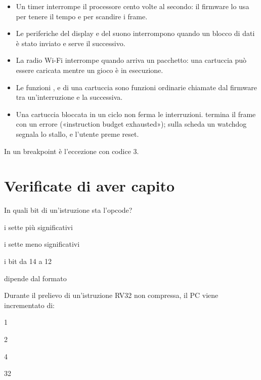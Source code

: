\begin{itemize}
\item Un timer interrompe il processore cento volte al secondo: il firmware lo
  usa per tenere il tempo e per scandire i frame.
\item Le periferiche del display e del suono interrompono quando un blocco di
  dati è stato inviato e serve il successivo.
\item La radio Wi-Fi interrompe quando arriva un pacchetto: una cartuccia può
  essere caricata mentre un gioco è in esecuzione.
\item Le funzioni ,  e  di una cartuccia
  sono funzioni ordinarie chiamate dal firmware tra un'interruzione e la
  successiva.
\item Una cartuccia bloccata in un ciclo non ferma le interruzioni. \prgqt
  termina il frame con un errore («instruction budget exhausted»); sulla
  scheda un watchdog segnala lo stallo, e l'utente preme reset.
\end{itemize}

In \prgqt un breakpoint è l'eccezione con codice 3.





\section{Verificate di aver capito}

\begin{quiz}{In quali bit di un'istruzione \riscv sta l'opcode?}
\item i sette più significativi
\item i sette meno significativi
\item i bit da 14 a 12
\item dipende dal formato
\end{quiz}

\begin{quiz}{Durante il prelievo di un'istruzione RV32 non compressa, il PC viene incrementato di:}
\item 1
\item 2
\item 4
\item 32
\end{quiz}

